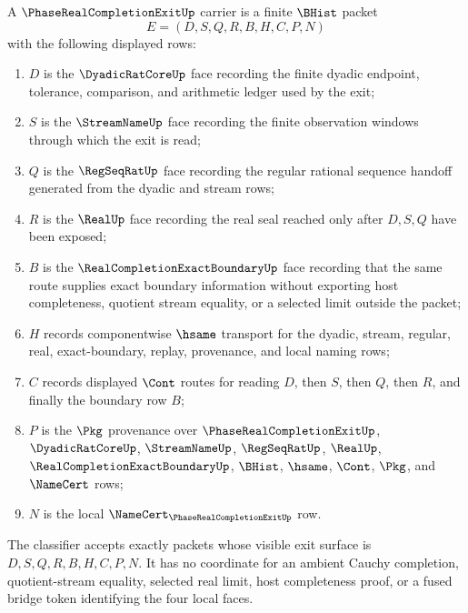 \begin{definition}
\label{def:phase-real-completion-exit-carrier}
A $\PhaseRealCompletionExitUp$ carrier is a finite $\BHist$ packet
$$
E=(D,S,Q,R,B,H,C,P,N)
$$
with the following displayed rows:
\begin{enumerate}
\item $D$ is the $\DyadicRatCoreUp$ face recording the finite dyadic endpoint, tolerance, comparison, and arithmetic ledger used by the exit;
\item $S$ is the $\StreamNameUp$ face recording the finite observation windows through which the exit is read;
\item $Q$ is the $\RegSeqRatUp$ face recording the regular rational sequence handoff generated from the dyadic and stream rows;
\item $R$ is the $\RealUp$ face recording the real seal reached only after $D,S,Q$ have been exposed;
\item $B$ is the $\RealCompletionExactBoundaryUp$ face recording that the same route supplies exact boundary information without exporting host completeness, quotient stream equality, or a selected limit outside the packet;
\item $H$ records componentwise $\hsame$ transport for the dyadic, stream, regular, real, exact-boundary, replay, provenance, and local naming rows;
\item $C$ records displayed $\Cont$ routes for reading $D$, then $S$, then $Q$, then $R$, and finally the boundary row $B$;
\item $P$ is the $\Pkg$ provenance over $\PhaseRealCompletionExitUp$, $\DyadicRatCoreUp$, $\StreamNameUp$, $\RegSeqRatUp$, $\RealUp$, $\RealCompletionExactBoundaryUp$, $\BHist$, $\hsame$, $\Cont$, $\Pkg$, and $\NameCert$ rows;
\item $N$ is the local $\NameCert_{\PhaseRealCompletionExitUp}$ row.
\end{enumerate}
The classifier accepts exactly packets whose visible exit surface is $D,S,Q,R,B,H,C,P,N$. It has no coordinate for an ambient Cauchy completion, quotient-stream equality, selected real limit, host completeness proof, or a fused bridge token identifying the four local faces.
\end{definition}

